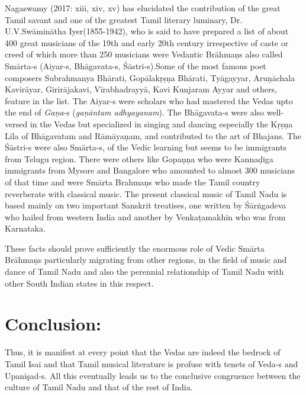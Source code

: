 Nagaswamy (2017: xiii, xiv, xv) has elucidated the contribution of the great Tamil savant and one of the greatest Tamil literary luminary, Dr. U.V.Swāminātha Iyer(1855-1942), who is said to have prepared a list of about 400 great musicians of the 19th and early 20th century irrespective of caste or creed of which more than 250 musicians were Vedantic Brāhmaṇs also called Smārta-s (Aiyar-s, Bhāgavata-s, Śāstri-s).Some of the most famous poet composers Subrahmanya Bhārati, Gopālakṛṣṇa Bhārati, Tyāgayyar, Aruṇāchala Kavirāyar, Girirājakavi, Vīrabhadrayyā, Kavi Kunjaram Ayyar and others, feature in the list. The Aiyar-s were scholars who had mastered the Vedas upto the end of \textit{Gaṇa}-s (\textit{gaṇāntam adhyayanam}). The Bhāgavata-s were also well-versed in the Vedas but specialized in singing and dancing especially the Kṛṣṇa Līla of Bhāgavatam and Rāmāyaṇam, and contributed to the art of Bhajans. The Śāstri-s were also Smārta-s, of the Vedic learning but seems to be immigrants from Telugu region. There were others like Gopaṇṇa who were Kannaḍiga immigrants from Mysore and Bangalore who amounted to almost 300 musicians of that time and were Smārta Brahmaṇs who made the Tamil country reverberate with classical music. The present classical music of Tamil Nadu is based mainly on two important Sanskrit treatises, one written by Śārṅgadeva who hailed from western India and another by Venkaṭamakhin who was from Karnataka.

These facts should prove sufficiently the enormous role of Vedic Smārta Brāhmaṇs particularly migrating from other regions, in the field of music and dance of Tamil Nadu and also the perennial relationship of Tamil Nadu with other South Indian states in this respect.


\section*{Conclusion:}

Thus, it is manifest at every point that the Vedas are indeed the bedrock of Tamil Isai and that Tamil musical literature is profuse with tenets of Veda-s and Upanişad-s. All this eventually leads us to the conclusive congruence between the culture of Tamil Nadu and that of the rest of India.

